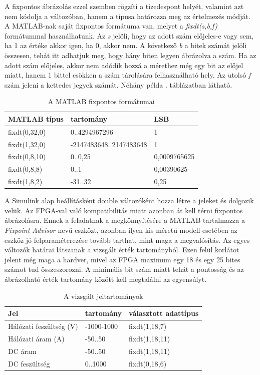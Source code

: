 A fixpontos ábrázolás ezzel szemben rögzíti a tizedespont helyét, valamint azt nem kódolja a változóban, hanem a típusa határozza meg az értelmezés módját. A MATLAB-nak saját fixpontos formátuma van, melyet a \emph{fixdt(s,b,f)} formátummal használhatunk. Az \emph{s} jelöli, hogy az adott szám előjeles-e vagy sem, ha 1 az értéke akkor igen, ha 0, akkor nem. A következő \emph{b} a bitek számát jelöli összesen, tehát itt adhatjuk meg, hogy hány biten legyen ábrázolva a szám. Ha az adott szám előjeles, akkor nem adódik hozzá a mérethez még egy bit az előjel miatt, hanem 1 bittel csökken a szám tárolására felhasználható hely. Az utolsó \emph{f} szám jeleni a kettedes jegyek számát. Néhány példa . táblázatban látható.

\begin{table}[]
\centering
\begin{tabular}{|l|l|l|}
\hline
MATLAB típus  & tartomány               & LSB \\ \hline
fixdt(0,32,0) & 0..4294967296           & 1   \\ \hline
fixdt(1,32,0) & -2147483648..2147483648	& 1   \\ \hline
fixdt(0,8,10) & 0..0,25        	   	    & 0,0009765625 \\ \hline
fixdt(0,8,8)  & 0..1     			 	& 0,00390625    \\ \hline
fixdt(1,8,2)  & -31..32     			& 0,25    \\ \hline
\end{tabular}
\caption{A MATLAB fixpontos formátumai}
\label{tab:fixdt}
\end{table}

A Simulink alap beállításként double változóként hozza létre a jeleket és dolgozik velük. Az FPGA-val való kompatibilitás miatt azonban át kell térni fixpontos ábrázolásra. Ennek a feladatnak a megkönnyítésére a MATLAB tartalmazza a \emph{Fixpoint Advisor} nevű eszközt, azonban ilyen kis méretű modell esetében az eszköz jó felparaméterezése tovább tarthat, mint maga a megvalósítás. Az egyes változók határai látszanak a vizsgált érték tartományból. Ezen felül korlátot jelent még maga a hardver, mivel az FPGA maximum egy 18 és egy 25 bites számot tud összeszorozni. A minimális bit szám miatt tehát a pontosság és az ábrázolható érték tartomány között kell megtalálni az egyensúlyt.

\begin{table}[]
\centering
\begin{tabular}{|l|l|l|}
\hline
Jel  					&		 tartomány              & választott adattípus \\ \hline
Hálózati feszültség (V) & -1000-1000          	 		& fixdt(1,18,7)\\ \hline
Hálózati áram (A) 		& -50..50						& fixdt(1,18,11)\\ \hline
DC áram 				& -50..50        	   	   		& fixdt(1,18,11) \\ \hline
DC feszültség  			& 0..1000     			 		& fixdt(0,18,6)    \\ \hline
\end{tabular}
\caption{A vizsgált jeltartományok}
\label{tab:values}
\end{table} 

